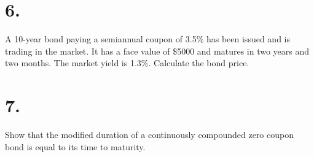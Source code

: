 \documentclass{article}
\begin{document}
\section*{6.}
{\Large 

A 10-year bond paying a semiannual coupon of 3.5\% has been issued and is trading in the market. It has a face value of \$5000 and matures in two years and two months. The market yield is 1.3\%. Calculate the bond price. \\

}

\section*{7.}
{\Large 

Show that the modified duration of a continuously compounded zero coupon bond is equal to its time to maturity. \\

}
\end{document}
